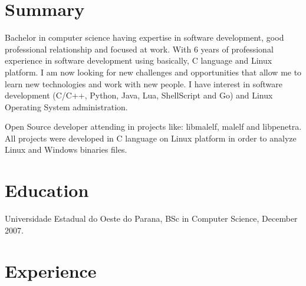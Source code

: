 \documentclass[margin]{res}
\begin{document}
  

\address{London, UK \\ benatto@gmail.com \\ Phone: 07405110040 \\ Post Code: SW16 2BU }
                           
                        
\begin{resume}                        
 
\section{Summary}       Bachelor in computer science having expertise in software development, good professional relationship 
                        and focused at work. With 6 years of professional experience in software development using basically, 
                        C language and Linux platform. I am now looking for new challenges and opportunities that allow me to learn 
                        new technologies and work with new people. I have interest in software development (C/C++, Python, Java,
                        Lua, ShellScript and Go) and Linux Operating System administration.
                        
                        Open Source developer attending in projects like: libmalelf, malelf and libpenetra. All projects were 
                        developed in C language on Linux platform in order to analyze Linux and Windows binaries files.
 
\section{Education}	Universidade Estadual do Oeste do Parana, BSc in Computer Science, December 2007.
  
\section{Experience}


\end{resume}
\end{document}
